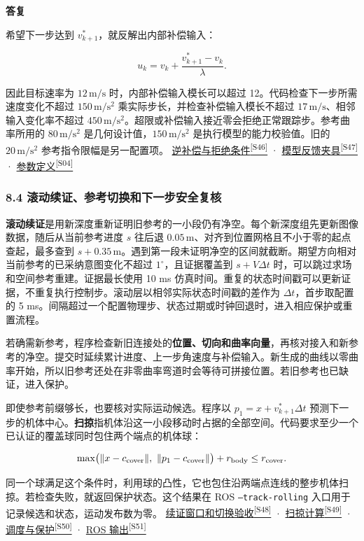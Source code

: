 \documentclass[11pt,a4paper]{article}
\numberwithin{equation}{topic}
\newenvironment{reply}{%
  \par\noindent\textcolor{replycolor}{\sffamily\bfseries 答复}\par\nobreak\ignorespaces
}{\par\medskip}
\newcommand{\sourceref}[2]{\hyperlink{source-#1}{#2\textsuperscript{[#1]}}}
\begin{document}
\begin{reply}
希望下一步达到 \(v^*_{k+1}\)，就反解出内部补偿输入：

\begin{equation}
\label{eq:compensation}
u_k=v_k+\frac{v^*_{k+1}-v_k}{\lambda}.
\end{equation}

因此目标速率为 \(12\,\mathrm{m/s}\) 时，内部补偿输入模长可以超过 12。代码检查下一步所需速度变化不超过 \(150\,\mathrm{m/s^2}\) 乘实际步长，并检查补偿输入模长不超过 \(17\,\mathrm{m/s}\)、相邻输入变化率不超过 \(450\,\mathrm{m/s^2}\)。超限或补偿输入接近零会拒绝正常跟踪步。参考曲率所用的 \(80\,\mathrm{m/s^2}\) 是几何设计值，\(150\,\mathrm{m/s^2}\) 是执行模型的能力校验值。旧的 \(20\,\mathrm{m/s^2}\) 参考指令限幅是另一配置项。 \sourceref{S46}{逆补偿与拒绝条件} · \sourceref{S47}{模型反馈夹具} · \sourceref{S04}{参数定义}

\subsubsection*{8.4 滚动续证、参考切换和下一步安全复核}

\textbf{滚动续证}是用新深度重新证明旧参考的一小段仍有净空。每个新深度组先更新图像数据，随后从当前参考进度 \(s\) 往后退 \(0.05\,\mathrm m\)、对齐到位置网格且不小于零的起点查起，最多查到 \(s+0.35\,\mathrm m\)。遇到第一段未证明净空的区间就截断。期望方向相对当前参考的已采纳意图变化不超过 \(1^\circ\)，且证据覆盖到 \(s+V\Delta t\) 时，可以跳过求场和空间参考重建。证据最长使用 10 ms 仿真时间。重复的状态时间戳可以更新证据，不重复执行控制步。滚动层以相邻实际状态时间戳的差作为 \(\Delta t\)，首步取配置的 5 ms。间隔超过一个配置物理步、状态过期或时钟回退时，进入相应保护或重置流程。

若确需新参考，程序检查新旧连接处的\textbf{位置、切向和曲率向量}，再核对接入和新参考的净空。提交时延续累计进度、上一步角速度与补偿输入。新生成的曲线以零曲率开始，所以旧参考还处在非零曲率弯道时会等待可拼接位置。若旧参考也已缺证，进入保护。

即使参考前缀够长，也要核对实际运动候选。程序以 \(p_1=x+v^*_{k+1}\Delta t\) 预测下一步的机体中心。\textbf{扫掠}指机体沿这一小段移动时占据的全部空间。代码要求至少一个已认证的覆盖球同时包住两个端点的机体球：

\begin{equation}
\label{eq:sweep}
\max\bigl(\|x-c_{\rm cover}\|,\ \|p_1-c_{\rm cover}\|\bigr)
+r_{\rm body}\le r_{\rm cover}.
\end{equation}

同一个球满足这个条件时，利用球的凸性，它也包住沿两端点连线的整步机体扫掠。若检查失败，就返回保护状态。这个结果在 ROS \texttt{--track-rolling} 入口用于记录候选和状态，运动发布数为零。 \sourceref{S48}{续证窗口和切换验收} · \sourceref{S49}{扫掠计算} · \sourceref{S50}{调度与保护} · \sourceref{S51}{ROS 输出}

\end{reply}
\end{document}
